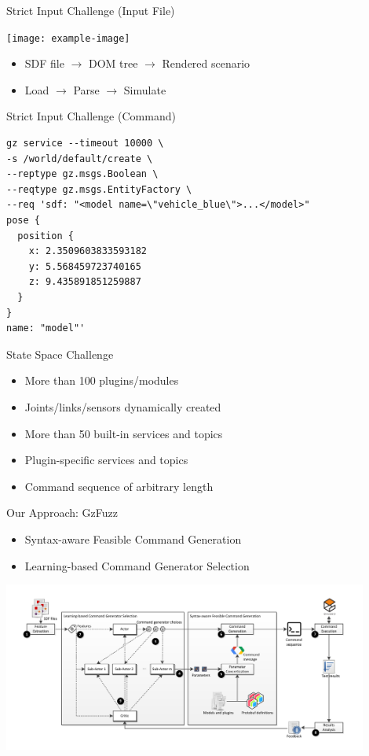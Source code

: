 \documentclass{beamer}
\begin{document}
\begin{frame}{Strict Input Challenge (Input File)}
\begin{center}
\texttt{[image: example-image]}
\end{center}
\begin{itemize}
\item SDF file $\rightarrow$ DOM tree $\rightarrow$ Rendered scenario
\item Load $\rightarrow$ Parse $\rightarrow$ Simulate
\end{itemize}
\end{frame}

\begin{frame}[fragile]{Strict Input Challenge (Command)}
\begin{verbatim}
gz service --timeout 10000 \
-s /world/default/create \
--reptype gz.msgs.Boolean \
--reqtype gz.msgs.EntityFactory \
--req 'sdf: "<model name=\"vehicle_blue\">...</model>"
pose {
  position {
    x: 2.3509603833593182
    y: 5.568459723740165
    z: 9.435891851259887
  }
}
name: "model"'
\end{verbatim}
\end{frame}

\begin{frame}{State Space Challenge}
\begin{itemize}
\item More than 100 plugins/modules
\item Joints/links/sensors dynamically created
\item More than 50 built-in services and topics
\item Plugin-specific services and topics
\item Command sequence of arbitrary length
\end{itemize}
\end{frame}

\begin{frame}[t]{Our Approach: GzFuzz}
\begin{itemize}
\item Syntax-aware Feasible Command Generation
\item Learning-based Command Generator Selection
\end{itemize}
\begin{center}
\includegraphics[width=0.9\textwidth]{images/workflow.pdf}
\end{center}
\end{frame}
\end{document}
